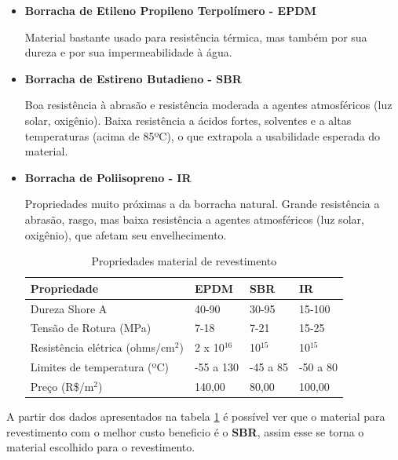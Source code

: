\begin{itemize}
    \item \textbf{Borracha de Etileno Propileno Terpolímero - EPDM }
    \par Material bastante usado para resistência térmica, mas também por sua dureza e por sua impermeabilidade à água.
    \item \textbf{Borracha de Estireno Butadieno - SBR} 
    \par Boa resistência à abrasão e resistência moderada a agentes atmosféricos (luz solar, oxigênio). Baixa resistência a ácidos fortes, solventes e a altas temperaturas (acima de 85ºC), o que extrapola a usabilidade esperada do material.
    \item \textbf{Borracha de Poliisopreno - IR}
    \par Propriedades muito próximas a da borracha natural. Grande resistência a abrasão, rasgo, mas baixa resistência a agentes atmosféricos (luz solar, oxigênio), que afetam seu envelhecimento.

\begin{table}[h!]
\centering
\begin{tabular}{|l|l|l|l|}
\hline
Propriedade & EPDM & SBR & IR \\ \hline
Dureza Shore A & 40-90 & 30-95 & 15-100 \\ \hline
Tensão de Rotura (MPa) & 7-18 & 7-21 & 15-25 \\ \hline
Resistência elétrica (ohms/cm$^2$) & 2 x 10$^{16}$ & 10$^{15}$ & 10$^{15}$ \\ \hline
Limites de temperatura (ºC) & -55 a 130  & -45 a 85 & -50 a 80 \\ \hline
Preço (R\$/m$^2$) & 140,00 & 80,00  & 100,00  \\ \hline
\end{tabular}
\caption{Propriedades material de revestimento}
\label{tab:revestimento}
\end{table}

\end{itemize}

\par A partir dos dados apresentados na tabela \ref{tab:revestimento} é possível ver que o material para revestimento com o melhor custo beneficio é o \textbf{SBR}, assim esse se torna o material escolhido para o revestimento. 

